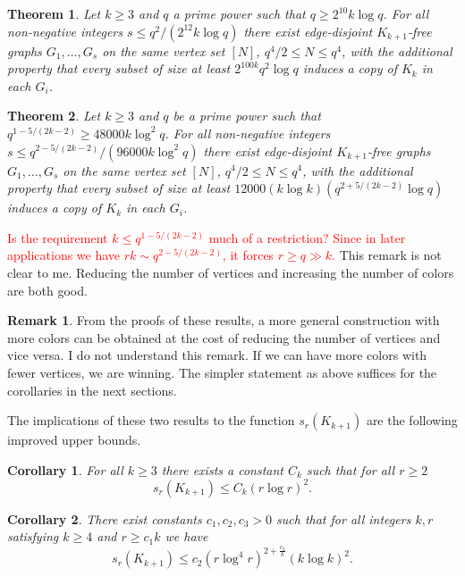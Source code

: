 \documentclass[12pt]{article}
\newcommand{\red}[1]{\textcolor{red}{#1}}
\newtheorem{theorem}{Theorem}
\newtheorem{corollary}{Corollary}
\theoremstyle{definition}
\newtheorem{remark}{Remark}
\begin{document}
	\begin{theorem}\label{thm:main}
		Let $k \geq 3$ and $q$ a prime power such that $q \geq 2^{10}k\log q$. For all non-negative integers $s \leq q^2/(2^{12}k\log q)$ there exist edge-disjoint $K_{k+1}$-free graphs $G_1,\dots,G_s$ on the same vertex set $[N]$, $q^4/2 \leq N \leq q^4$, with the additional property that every subset of size at least $2^{100k}q^2\log q$ induces a copy of $K_k$ in each $G_i$.
	\end{theorem}
	
	\begin{theorem}\label{thm:main2}
		Let $k\geq 3$ and $q$ be a prime power such that $q^{1-5/(2k-2)} \geq 48000k\log^2q$. For all non-negative integers $s \leq q^{2-5/(2k-2)}/(96000k\log^2 q)$ there exist edge-disjoint $K_{k+1}$-free graphs $G_1,\dots,G_s$ on the same vertex set $[N]$, $q^4/2 \leq N \leq q^4$, with the additional property that every subset of size at least $12000(k\log k)(q^{2+5/(2k-2)}\log q)$ induces a copy of $K_k$ in each $G_i$.
	\end{theorem}
	
	\red{Is the requirement $k \leq q^{1-5/(2k-2)}$ much of a restriction? Since in later applications we have $rk \sim q^{2-5/(2k-2)}$, it forces $r \geq q \gg k$.}
	This remark is not clear to me. Reducing the number of vertices and increasing the number of colors are both good.
	
	\begin{remark}\label{remark:morecolors}
		From the proofs of these results, a more general construction with more colors can be obtained at the cost of reducing the number of vertices and vice versa. {\color{blue} I do not understand this remark. If we can have more colors with fewer vertices, we are winning.} The simpler statement as above suffices for the corollaries in the next sections.
	\end{remark}
	
	The implications of these two results to the function $s_r(K_{k+1})$ are the following improved upper bounds.   
	
	\begin{corollary}\label{cor:cor1}
		For all $k \geq 3$ there exists a constant $C_k$ such that for all $r \geq 2$
		\[s_r(K_{k+1}) \leq C_k (r\log r)^2. \]
	\end{corollary}
	
	\begin{corollary}\label{cor:cor2}
		There exist constants $c_1,c_2,c_3 > 0$ such that for all integers $k,r$ satisfying $k \geq 4$ and $r \geq c_1k$ we have 
		\[s_r(K_{k+1}) \leq c_2(r\log^4 r)^{2+\frac{c_3}{k}}(k\log k)^2. \]
	\end{corollary}
	
\end{document}
